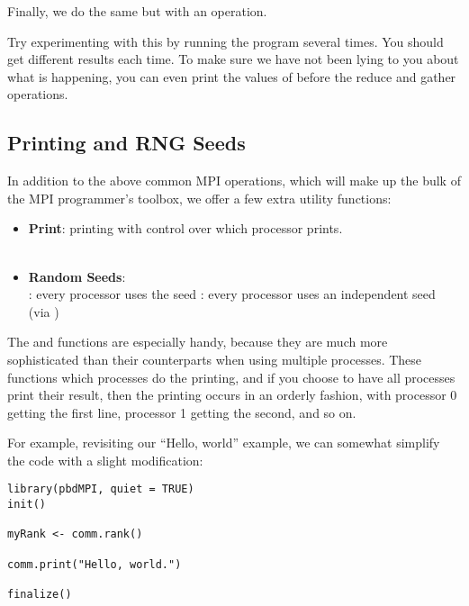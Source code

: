 Finally, we do the same but with an  operation.  

Try experimenting with this by running the program several times.  You should get different results each time.  To make sure we have not been lying to you about what is happening, you can even print the values of  before the reduce and gather operations.



\subsection{Printing and RNG Seeds}\label{sec:pbdsugar}

In addition to the above common MPI operations, which will make up the bulk of the MPI programmer's toolbox, we offer a few extra utility functions:

\begin{itemize}
  \item \textbf{Print}: printing with control over which processor prints.\\
  \\
  \item \textbf{Random Seeds}: \\
  :  every processor uses the seed 
  : every processor uses an independent seed (via )
\end{itemize}

The  and  functions are especially handy, because they are much more sophisticated than their  counterparts when using multiple processes.  These functions which processes do the printing, and if you choose to have all processes print their result, then the printing occurs in an orderly fashion, with processor 0 getting the first line, processor 1 getting the second, and so on.

For example, revisiting our ``Hello, world'' example, we can somewhat simplify the code with a slight modification:

\begin{lstlisting}[language=rr,title=Simple pbdMPI Example 3]
library(pbdMPI, quiet = TRUE)
init()

myRank <- comm.rank()

comm.print("Hello, world.")

finalize()
\end{lstlisting}

